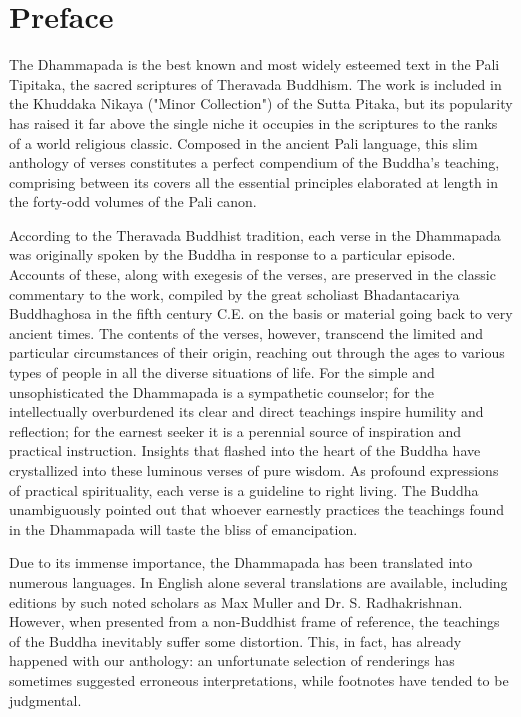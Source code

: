 \newpage
\chapter{Preface}

The Dhammapada is the best known and most widely esteemed text in the Pali Tipitaka, the sacred scriptures of Theravada Buddhism. The work is included in the Khuddaka Nikaya ("Minor Collection") of the Sutta Pitaka, but its popularity has raised it far above the single niche it occupies in the scriptures to the ranks of a world religious classic. Composed in the ancient Pali language, this slim anthology of verses constitutes a perfect compendium of the Buddha's teaching, comprising between its covers all the essential principles elaborated at length in the forty-odd volumes of the Pali canon.

According to the Theravada Buddhist tradition, each verse in the Dhammapada was originally spoken by the Buddha in response to a particular episode. Accounts of these, along with exegesis of the verses, are preserved in the classic commentary to the work, compiled by the great scholiast Bhadantacariya Buddhaghosa in the fifth century C.E. on the basis or material going back to very ancient times. The contents of the verses, however, transcend the limited and particular circumstances of their origin, reaching out through the ages to various types of people in all the diverse situations of life. For the simple and unsophisticated the Dhammapada is a sympathetic counselor; for the intellectually overburdened its clear and direct teachings inspire humility and reflection; for the earnest seeker it is a perennial source of inspiration and practical instruction. Insights that flashed into the heart of the Buddha have crystallized into these luminous verses of pure wisdom. As profound expressions of practical spirituality, each verse is a guideline to right living. The Buddha unambiguously pointed out that whoever earnestly practices the teachings found in the Dhammapada will taste the bliss of emancipation.

Due to its immense importance, the Dhammapada has been translated into numerous languages. In English alone several translations are available, including editions by such noted scholars as Max Muller and Dr. S. Radhakrishnan. However, when presented from a non-Buddhist frame of reference, the teachings of the Buddha inevitably suffer some distortion. This, in fact, has already happened with our anthology: an unfortunate selection of renderings has sometimes suggested erroneous interpretations, while footnotes have tended to be judgmental.


